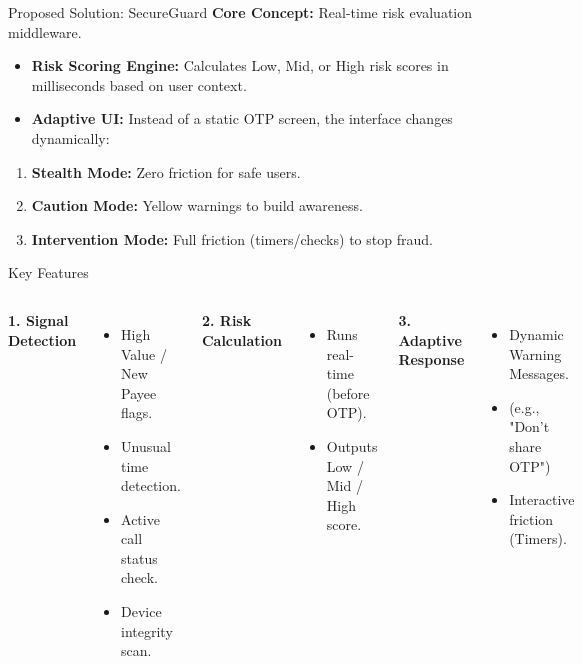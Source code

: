 \documentclass[aspectratio=169, 10pt]{beamer}
\begin{document}
\begin{frame}{Proposed Solution: SecureGuard}
    \textbf{Core Concept:} Real-time risk evaluation middleware.

    \vspace{0.5cm}

    \begin{itemize}
        \item \textbf{Risk Scoring Engine:} Calculates Low, Mid, or High risk scores in milliseconds based on user context.
        \item \textbf{Adaptive UI:} Instead of a static OTP screen, the interface changes dynamically:
    \end{itemize}

    \vspace{0.3cm}

    \begin{enumerate}
        \item \textbf{Stealth Mode:} Zero friction for safe users.
        \item \textbf{Caution Mode:} Yellow warnings to build awareness.
        \item \textbf{Intervention Mode:} Full friction (timers/checks) to stop fraud.
    \end{enumerate}
\end{frame}

\begin{frame}{Key Features}
    \begin{columns}[t]
        \textbf{1. Signal Detection}
        \begin{itemize}
            \item \small High Value / New Payee flags.
            \item \small Unusual time detection.
            \item \small Active call status check.
            \item \small Device integrity scan.
        \end{itemize}

        \textbf{2. Risk Calculation}
        \begin{itemize}
            \item \small Runs real-time (before OTP).
            \item \small Outputs Low / Mid / High score.
        \end{itemize}

        \textbf{3. Adaptive Response}
        \begin{itemize}
            \item \small Dynamic Warning Messages.
            \item \scriptsize (e.g., "Don't share OTP")
            \item \small Interactive friction (Timers).
        \end{itemize}
    \end{columns}
\end{frame}
\end{document}
